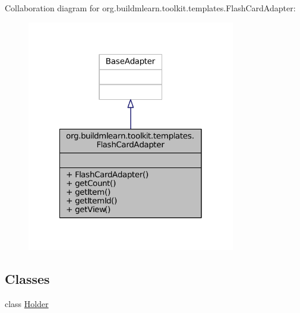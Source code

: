 Collaboration diagram for org.\-buildmlearn.\-toolkit.\-templates.\-Flash\-Card\-Adapter\-:
\nopagebreak
\begin{figure}[H]
\begin{center}
\leavevmode
\includegraphics[width=258pt]{d0/d43/classorg_1_1buildmlearn_1_1toolkit_1_1templates_1_1FlashCardAdapter__coll__graph}
\end{center}
\end{figure}
\subsection*{Classes}
\begin{DoxyCompactItemize}
\item 
class \hyperlink{classorg_1_1buildmlearn_1_1toolkit_1_1templates_1_1FlashCardAdapter_1_1Holder}{Holder}
\end{DoxyCompactItemize}
